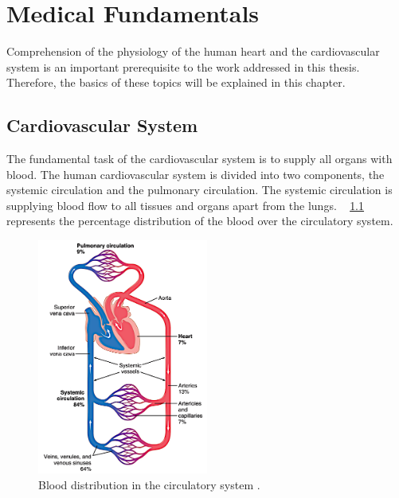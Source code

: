 \chapter{Medical Fundamentals}
Comprehension of the physiology of the human heart and the cardiovascular system is an important prerequisite to the work addressed in this thesis. Therefore, the basics of these topics will be explained in this chapter.

\section{Cardiovascular System}
The fundamental task of the cardiovascular system is to supply all organs with blood. The human cardiovascular system is divided into two components, the systemic circulation and the pulmonary circulation. The systemic circulation is supplying blood flow to all tissues and organs apart from the lungs. \figurename~ \ref{fig:circulation} represents the percentage distribution of the blood over the circulatory system. \cite{GH20}
\begin{figure}[h]
  \centering
  \includegraphics[width=0.5\textwidth, height=0.7\textwidth]{images/circulation.jpg}
  \caption[Blood distribution in the ciculatory system]{Blood distribution in the circulatory system \cite{GH20}.}
  \label{fig:circulation}
\end{figure}
